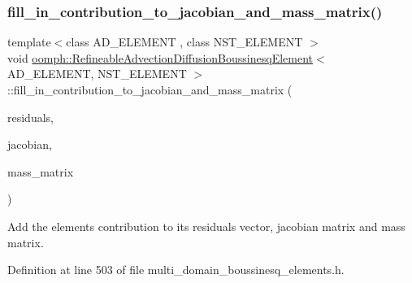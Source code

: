 \subsubsection{\texorpdfstring{fill\+\_\+in\+\_\+contribution\+\_\+to\+\_\+jacobian\+\_\+and\+\_\+mass\+\_\+matrix()}{fill\_in\_contribution\_to\_jacobian\_and\_mass\_matrix()}}
{\footnotesize\ttfamily template$<$class A\+D\+\_\+\+E\+L\+E\+M\+E\+NT , class N\+S\+T\+\_\+\+E\+L\+E\+M\+E\+NT $>$ \\
void \hyperlink{classoomph_1_1RefineableAdvectionDiffusionBoussinesqElement}{oomph\+::\+Refineable\+Advection\+Diffusion\+Boussinesq\+Element}$<$ A\+D\+\_\+\+E\+L\+E\+M\+E\+NT, N\+S\+T\+\_\+\+E\+L\+E\+M\+E\+NT $>$\+::fill\+\_\+in\+\_\+contribution\+\_\+to\+\_\+jacobian\+\_\+and\+\_\+mass\+\_\+matrix (\begin{DoxyParamCaption}\item[{Vector$<$ double $>$ \&}]{residuals,  }\item[{Dense\+Matrix$<$ double $>$ \&}]{jacobian,  }\item[{Dense\+Matrix$<$ double $>$ \&}]{mass\+\_\+matrix }\end{DoxyParamCaption})\hspace{0.3cm}{\ttfamily [inline]}}



Add the element\textquotesingle{}s contribution to its residuals vector, jacobian matrix and mass matrix. 



Definition at line 503 of file multi\+\_\+domain\+\_\+boussinesq\+\_\+elements.\+h.

\mbox{\label{classoomph_1_1RefineableAdvectionDiffusionBoussinesqElement_ac787480832d09daf1bd1f14715dc6820}} 
